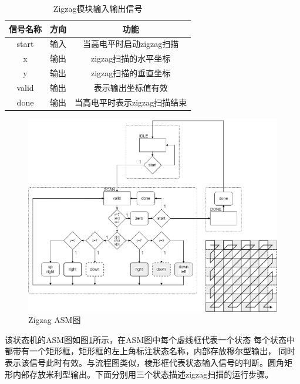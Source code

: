 \documentclass{article}
\numberwithin {equation}{section}
\begin{document}
\begin{spacing}{1.25}
        \begin{table}[H]
          \caption{Zigzag模块输入输出信号}
          \label{zigzag io}
          \centering
          \begin{tabular}{ccc}
            \toprule
            信号名称 & 方向 & 功能\\
            \midrule
            start & 输入 & 当高电平时启动zigzag扫描\\
            x & 输出 & zigzag扫描的水平坐标\\
            y & 输出 & zigzag扫描的垂直坐标\\
            valid & 输出 & 表示输出坐标值有效\\
            done & 输出 & 当高电平时表示zigzag扫描结束\\
            \bottomrule
          \end{tabular}
        \end{table}

        \begin{figure}[H]
          \centering
          \includegraphics[scale=0.4]{./pictures/zigzag ASM.png}
          \caption{Zigzag ASM图}
          \label{zigzag ASM}
        \end{figure}

        该状态机的ASM图如图\ref{zigzag ASM}所示，在ASM图中每个虚线框代表一个状态
        每个状态中都带有一个矩形框，矩形框的左上角标注状态名称，内部存放穆尔型输出，
        同时表示该信号此时有效。与流程图类似，棱形框代表状态输入信号的判断。圆角矩
        形内部存放米利型输出。下面分别用三个状态描述zigzag扫描的运行步骤。


\end{spacing}
\end{document}
